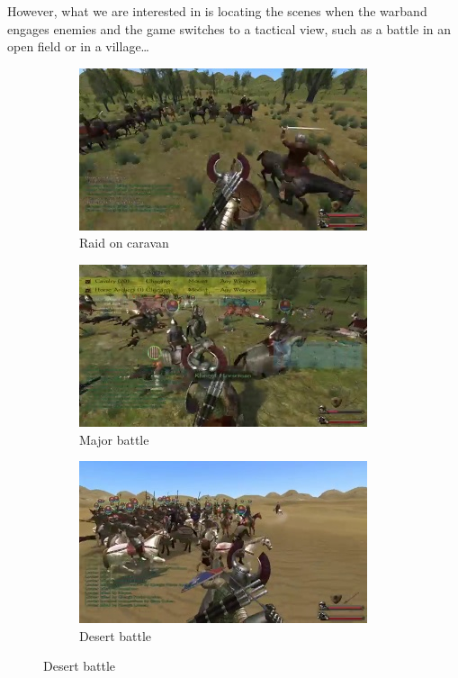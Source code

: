 \documentclass[
]{article}
\begin{document}
However, what we are interested in is locating the scenes when the
warband engages enemies and the game switches to a tactical view, such
as a battle in an open field or in a village\ldots{}

\begin{figure}
	\centering
	\begin{subfigure}[b]{0.3\textwidth}
		\includegraphics[width=\linewidth]{docimages/E_0060_00_44_20.jpg}
		\caption{Raid on caravan}
	\end{subfigure}
	\begin{subfigure}[b]{0.3\textwidth}
		\includegraphics[width=\linewidth]{docimages/E_0066_01_21_18.jpg}
		\caption{Major battle}
	\end{subfigure}
	\begin{subfigure}[b]{0.3\textwidth}
		\includegraphics[width=\linewidth]{docimages/E_0065_00_29_08.jpg}
		\caption{Desert battle}
	\end{subfigure}
\end{figure}
\end{document}
